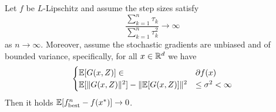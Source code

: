 \begin{theorem}
    Let $f$ be $L$-Lipschitz and assume the step sizes satisfy
    \[
        \frac{\sum_{k=1}^n\tau_k}{\sum_{k=1}^n\tau_k^2}\rightarrow \infty
    \]
    as $n\rightarrow\infty$. 
    Moreover, assume the stochastic gradients are unbiased and of bounded variance, specifically, for all $x\in \mathbb{R}^d$ we have
    \begin{equation}
        \begin{cases}
            \mathbb{E}[G(x,Z)] \in &\partial f(x)\\
            \mathbb{E}[\|G(x,Z)\|^2] - \|\mathbb{E}[G(x,Z)]\|^2 &\leq \sigma^2<\infty
        \end{cases}
    \end{equation}
Then it holds $\mathbb{E}[f^n_{\mathrm{best}}-f(x^*)]\rightarrow 0$.
\end{theorem}
